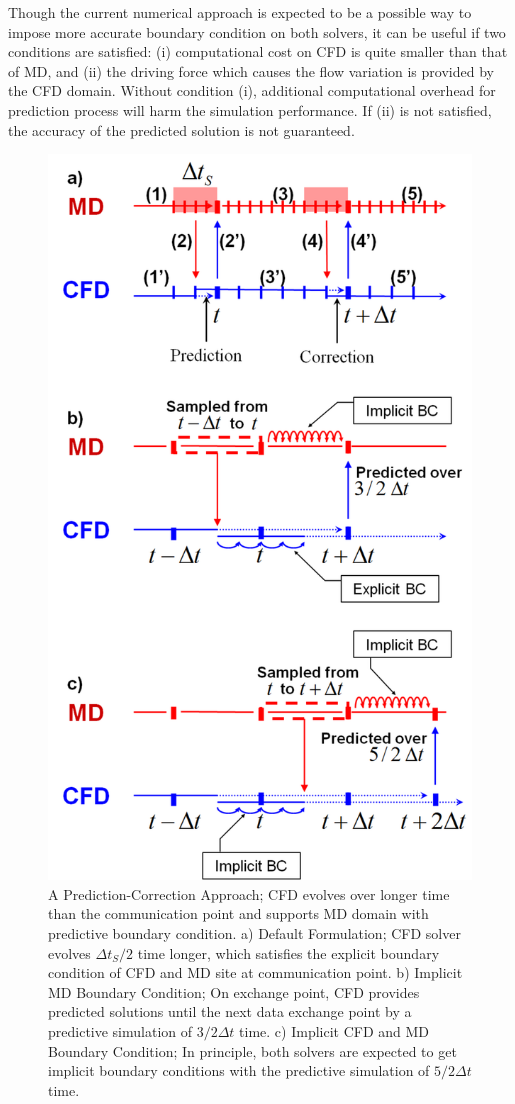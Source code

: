 \documentclass[preprint,12pt]{elsarticle}
\begin{document}
Though the current numerical approach is expected to be a possible way to impose more accurate boundary condition on both solvers, it can be useful if two conditions are satisfied: (i) computational cost on CFD is quite smaller than that of MD, and (ii) the driving force which causes the flow variation is provided by the CFD domain. Without condition (i), additional computational overhead for prediction process will harm the simulation performance. If (ii) is not satisfied, the accuracy of the predicted solution is not guaranteed.


\begin{figure}
\centering
\includegraphics[width=0.6\linewidth]{Prediction_Correction_Full.pdf}
\vskip-0.2cm
\caption{\small A Prediction-Correction Approach; CFD evolves over longer time than the communication point and supports MD domain with predictive boundary condition. a) Default Formulation; CFD solver evolves $\Delta t_S / 2$ time longer, which satisfies the explicit boundary condition of CFD and MD site at communication point. b) Implicit MD Boundary Condition; On exchange point, CFD provides predicted solutions until the next data exchange point by a predictive simulation of $3/2 \Delta t$ time. c) Implicit CFD and MD Boundary Condition; In principle, both solvers are expected to get implicit boundary conditions with the predictive simulation of $5/2 \Delta t$ time.}
\label{Hybrid_Timescale2}
\end{figure}
\end{document}
